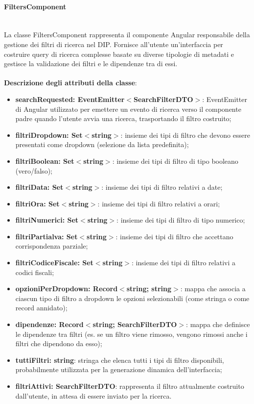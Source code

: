 \documentclass[a4paper,12pt]{article}
\begin{document}
{{{{                \paragraph{FiltersComponent}\label{par:FiltersComponent}\mbox{}\\
                La classe FiltersComponent rappresenta il componente Angular responsabile della gestione dei filtri di ricerca nel DIP. Fornisce all'utente un'interfaccia per costruire query di ricerca complesse basate su diverse tipologie di metadati e gestisce la validazione dei filtri e le dipendenze tra di essi.\\
                \\
                \textbf{Descrizione degli attributi della classe}:
                \begin{itemize}
                    \item \textbf{searchRequested: EventEmitter$<$SearchFilterDTO$>$}: EventEmitter di Angular utilizzato per emettere un evento di ricerca verso il componente padre quando l'utente avvia una ricerca, trasportando il filtro costruito;
                    \item \textbf{filtriDropdown: Set$<$string$>$}: insieme dei tipi di filtro che devono essere presentati come dropdown (selezione da lista predefinita);
                    \item \textbf{filtriBoolean: Set$<$string$>$}: insieme dei tipi di filtro di tipo booleano (vero/falso);
                    \item \textbf{filtriData: Set$<$string$>$}: insieme dei tipi di filtro relativi a date;
                    \item \textbf{filtriOra: Set$<$string$>$}: insieme dei tipi di filtro relativi a orari;
                    \item \textbf{filtriNumerici: Set$<$string$>$}: insieme dei tipi di filtro di tipo numerico;
                    \item \textbf{filtriPartialva: Set$<$string$>$}: insieme dei tipi di filtro che accettano corrispondenza parziale;
                    \item \textbf{filtriCodiceFiscale: Set$<$string$>$}: insieme dei tipi di filtro relativi a codici fiscali;
                    \item \textbf{opzioniPerDropdown: Record$<$string; string$>$}: mappa che associa a ciascun tipo di filtro a dropdown le opzioni selezionabili (come stringa o come record annidato);
                    \item \textbf{dipendenze: Record$<$string; SearchFilterDTO$>$}: mappa che definisce le dipendenze tra filtri (es. se un filtro viene rimosso, vengono rimossi anche i filtri che dipendono da esso);
                    \item \textbf{tuttiFiltri: string}: stringa che elenca tutti i tipi di filtro disponibili, probabilmente utilizzata per la generazione dinamica dell'interfaccia;
                    \item \textbf{filtriAttivi: SearchFilterDTO}: rappresenta il filtro attualmente costruito dall'utente, in attesa di essere inviato per la ricerca.
                \end{itemize}
                
}}}}
\end{document}
